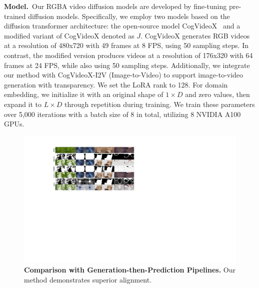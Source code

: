 \vspace{0.5em}
\noindent\textbf{Model.}~Our RGBA video diffusion models are developed by fine-tuning pre-trained diffusion models. Specifically, we employ two models based on the diffusion transformer architecture: the open-source model CogVideoX~\cite{yang2024cogvideox} and a modified variant of CogVideoX denoted as \(J\). 
CogVideoX generates RGB videos at a resolution of 480x720 with 49 frames at 8 FPS, using 50 sampling steps. In contrast, the modified version produces videos at a resolution of 176x320 with 64 frames at 24 FPS, while also using 50 sampling steps. Additionally, we integrate our method with CogVideoX-I2V (Image-to-Video) to support image-to-video generation with transparency.
We set the LoRA rank to 128. For domain embedding, we initialize it with an original shape of \(1\times D\) and zero values, then expand it to \(L\times D\) through repetition during training. 
We train these parameters over 5,000 iterations with a batch size of 8 in total, utilizing 8 NVIDIA A100 GPUs.



\begin{figure}[htbp]
    \centering
    \includegraphics[width=1.0\linewidth]{figs/exp-comparison.pdf}
    \vspace{-0.2in}
    \caption{\textbf{Comparison with Generation-then-Prediction Pipelines.} Our method demonstrates superior alignment.
}
    \label{fig-comparison}
\end{figure}

